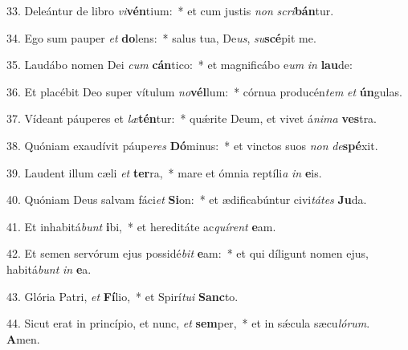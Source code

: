 33. Deleántur de libro \textit{vi}\textbf{vén}tium:~*  et cum justis \textit{non} \textit{scri}\textbf{bán}tur.\

34. Ego sum pauper \textit{et} \textbf{do}lens:~*  salus tua, De\textit{us}, \textit{su}\textbf{scé}pit me.\

35. Laudábo nomen Dei \textit{cum} \textbf{cán}tico:~*  et magnificábo e\textit{um} \textit{in} \textbf{lau}de:\

36. Et placébit Deo super vítulum \textit{no}\textbf{vél}lum:~*  córnua producén\textit{tem} \textit{et} \textbf{ún}gulas.\

37. Vídeant páuperes et \textit{læ}\textbf{tén}tur:~*  quǽrite Deum, et vivet á\textit{ni}\textit{ma} \textbf{ves}tra.\

38. Quóniam exaudívit páupe\textit{res} \textbf{Dó}minus:~*  et vinctos suos \textit{non} \textit{de}\textbf{spé}xit.\

39. Laudent illum cæli \textit{et} \textbf{ter}ra,~*  mare et ómnia reptíli\textit{a} \textit{in} \textbf{e}is.\

40. Quóniam Deus salvam fáci\textit{et} \textbf{Si}on:~*  et ædificabúntur civi\textit{tá}\textit{tes} \textbf{Ju}da.\

41. Et inhabitá\textit{bunt} \textbf{i}bi,~*  et hereditáte ac\textit{quí}\textit{rent} \textbf{e}am.\

42. Et semen servórum ejus possidé\textit{bit} \textbf{e}am:~*  et qui díligunt nomen ejus, habitá\textit{bunt} \textit{in} \textbf{e}a.\

43. Glória Patri, \textit{et} \textbf{Fí}lio,~*  et Spirí\textit{tu}\textit{i} \textbf{Sanc}to.\

44. Sicut erat in princípio, et nunc, \textit{et} \textbf{sem}per,~*  et in sǽcula sæcu\textit{ló}\textit{rum}. \textbf{A}men.\

